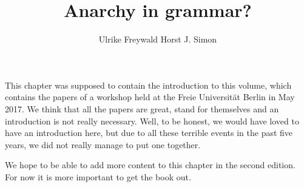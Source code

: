 \documentclass[output=paper
  ,nobabel
  ,draftmode
  ,colorlinks, citecolor=brown
]{langscibook}
\title{Anarchy in grammar?}
\author{Ulrike Freywald\orcid{0000-0003-3268-7874}\affiliation{TU Dortmund} \lastand Horst J. Simon\orcid{0000-0002-6367-2969}\affiliation{Freie Universität Berlin}}
\begin{document}
\maketitle

This chapter was supposed to contain the introduction to this volume, which contains the papers of a
workshop held at the Freie Universität Berlin in May 2017. We think that all the papers are great, stand
for themselves and an introduction is not really necessary. Well, to be honest, we would have loved
to have an introduction here, but due to all these terrible events in the past five years, we did
not really manage to put one together.

We hope to be able to add more content to this chapter in the second edition. For now it is more
important to get the book out.



{\sloppy
\printbibliography[heading=subbibliography,notkeyword=this]
}
\end{document}
